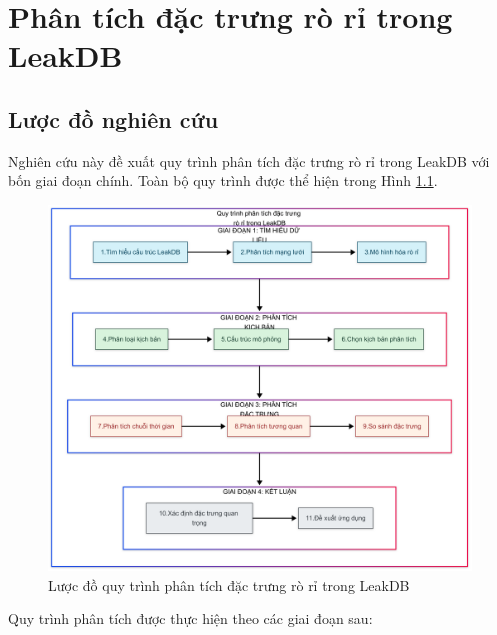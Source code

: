 \chapter{Phân tích đặc trưng rò rỉ trong LeakDB}
\section{Lược đồ nghiên cứu}

Nghiên cứu này đề xuất quy trình phân tích đặc trưng rò rỉ trong LeakDB với bốn giai đoạn chính. Toàn bộ quy trình được thể hiện trong Hình \ref{fig:luocdo_phantich_leakdb}.

\begin{figure}[H]
    \centering
    \includegraphics[width=\textwidth]{image/section5_1/luoc_do_phan_tich_leakdb.png}
    \caption{Lược đồ quy trình phân tích đặc trưng rò rỉ trong LeakDB}
    \label{fig:luocdo_phantich_leakdb}
\end{figure}

Quy trình phân tích được thực hiện theo các giai đoạn sau:

